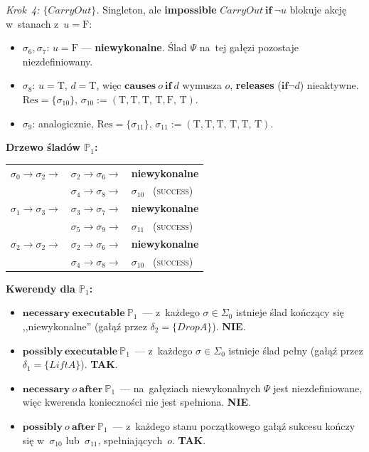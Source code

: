 \documentclass[11pt,a4paper]{article}
\newcommand{\causes}{\textbf{causes}}
\newcommand{\aft}{\textbf{after}}
\renewcommand{\iff}{\textbf{if}}
\newcommand{\impossible}{\textbf{impossible}}
\newcommand{\releases}{\textbf{releases}}
\newcommand{\necessary}{\textbf{necessary}}
\newcommand{\possibly}{\textbf{possibly}}
\newcommand{\executable}{\textbf{executable}}
\theoremstyle{definition}
\begin{document}
\medskip
\noindent\textit{Krok~4: $\{\mathit{CarryOut}\}$.}
Singleton, ale \impossible{} $\mathit{CarryOut}\ \iff\ \neg u$
blokuje akcję w~stanach z~$u = \text{F}$:
\begin{itemize}[topsep=2pt]
  \item $\sigma_6, \sigma_7$: $u = \text{F}$ --- \textbf{niewykonalne}.
        Ślad $\Psi$ na~tej gałęzi pozostaje niezdefiniowany.
  \item $\sigma_8$: $u = \text{T}$, $d = \text{T}$, więc $\causes\ o\ \iff\ d$ wymusza $o$,
        \releases{} ($\iff \neg d$) nieaktywne. $\mathrm{Res} = \{\sigma_{10}\}$,
        $\sigma_{10} := (\text{T},\text{T},\text{T},\,\text{T},\text{F},\,\text{T})$.
  \item $\sigma_9$: analogicznie, $\mathrm{Res} = \{\sigma_{11}\}$,
        $\sigma_{11} := (\text{T},\text{T},\text{T},\,\text{T},\text{T},\,\text{T})$.
\end{itemize}

\medskip
\noindent\textbf{Drzewo śladów $\mathbb{P}_1$:}
\begin{center}
\begin{tabular}{@{}l@{\ }c@{\ }l@{}}
$\sigma_0 \to \sigma_2 \to$ & $\sigma_2 \to \sigma_6 \to$ & \textbf{niewykonalne} \\
                            & $\sigma_4 \to \sigma_8 \to$ & $\sigma_{10}$ \ (\textsc{success}) \\[2pt]
$\sigma_1 \to \sigma_3 \to$ & $\sigma_3 \to \sigma_7 \to$ & \textbf{niewykonalne} \\
                            & $\sigma_5 \to \sigma_9 \to$ & $\sigma_{11}$ \ (\textsc{success}) \\[2pt]
$\sigma_2 \to \sigma_2 \to$ & $\sigma_2 \to \sigma_6 \to$ & \textbf{niewykonalne} \\
                            & $\sigma_4 \to \sigma_8 \to$ & $\sigma_{10}$ \ (\textsc{success}) \\
\end{tabular}
\end{center}

\medskip
\noindent\textbf{Kwerendy dla $\mathbb{P}_1$:}
\begin{itemize}
  \item $\necessary\ \executable\ \mathbb{P}_1$~---
    z~każdego $\sigma \in \Sigma_0$ istnieje ślad kończący się ,,niewykonalne''
    (gałąź przez $\delta_2 = \{\mathit{DropA}\}$). \textbf{NIE}.

  \item $\possibly\ \executable\ \mathbb{P}_1$~---
    z~każdego $\sigma \in \Sigma_0$ istnieje ślad pełny
    (gałąź przez $\delta_1 = \{\mathit{LiftA}\}$). \textbf{TAK}.

  \item $\necessary\ o\ \aft\ \mathbb{P}_1$~---
    na~gałęziach niewykonalnych $\Psi$ jest niezdefiniowane, więc kwerenda
    konieczności nie jest spełniona. \textbf{NIE}.

  \item $\possibly\ o\ \aft\ \mathbb{P}_1$~---
    z~każdego stanu początkowego gałąź sukcesu kończy się w~$\sigma_{10}$ lub~$\sigma_{11}$, spełniających~$o$. \textbf{TAK}.
\end{itemize}
\end{document}
